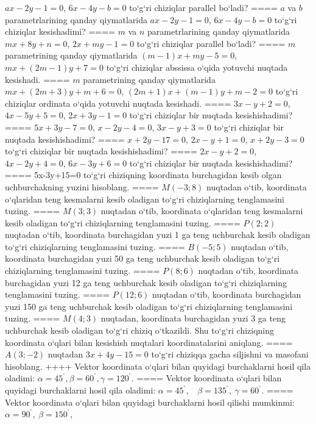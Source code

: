 $ax-2y-1=0$, $6x-4y-b=0$ to‘g‘ri chiziqlar parallel bo‘ladi?
====
$a$ va $b$ parametrlarining qanday qiymatlarida
$ax-2y-1=0$, $6x-4y-b=0$ to‘g‘ri chiziqlar kesishadimi?
====
$m$ va $n$ parametrlarining qanday qiymatlarida
$mx+8y+n=0$, $2x+my-1=0$ to‘g‘ri chiziqlar parallel bo‘ladi?
====
$m$ parametrining qanday qiymatlarida
$ (m-1) x+my-5=0$, $mx+ (2m-1) y+7=0$ to‘g‘ri chiziqlar abssissa
o‘qida yotuvchi nuqtada kesishadi.
====
$m$ parametrining qanday qiymatlarida
$mx+ (2m+3) y+m+6=0$, $ (2m+1) x+ (m-1) y+m-2=0$ to‘g‘ri chiziqlar ordinata
o‘qida yotuvchi nuqtada kesishadi.
====
$3x-y+2=0$, $4x-5y+5=0$, $2x+3y-1=0$
to‘g‘ri chiziqlar bir nuqtada kesishishadimi?
====
$5x+3y-7=0$, $x-2y-4=0$, $3x-y+3=0$
to‘g‘ri chiziqlar bir nuqtada kesishishadimi?
====
$x+2y-17=0$, $2x-y+1=0$, $x+2y-3=0$
to‘g‘ri chiziqlar bir nuqtada kesishishadimi?
====
$2x-y+2=0$, $4x-2y+4=0$, $6x-3y+6=0$
to‘g‘ri chiziqlar bir nuqtada kesishishadimi?
====
5x-3y+15=0 to‘g‘ri chiziqning koordinata burchagidan
kesib olgan uchburchakning yuzini hisoblang.
====
$M (-3;8) $ nuqtadan o‘tib, koordinata o‘qlaridan
teng kesmalarni kesib oladigan to‘g‘ri chiziqlarning tenglamasini tuzing.
====
$M (3;3)$ nuqtadan o‘tib, koordinata o‘qlaridan teng
kesmalarni kesib oladigan to‘g‘ri chiziqlarning tenglamasini tuzing.
====
$P (2;2)$ nuqtadan o‘tib, koordinata burchagidan
yuzi 1 ga teng uchburchak kesib oladigan to‘g‘ri chiziqlarning
tenglamasini tuzing.
====
$B (-5;5)$ nuqtadan o‘tib, koordinata burchagidan
yuzi 50 ga teng uchburchak kesib oladigan to‘g‘ri chiziqlarning tenglamasini
tuzing.
====
$P (8;6) $ nuqtadan o‘tib, koordinata burchagidan
yuzi 12 ga teng uchburchak kesib oladigan to‘g‘ri chiziqlarning tenglamasini
tuzing.
====
$P (12;6)$ nuqtadan o‘tib, koordinata burchagidan
yuzi 150 ga teng uchburchak kesib oladigan to‘g‘ri chiziqlarning
tenglamasini tuzing.
====
$M (4;3) $ nuqtadan, koordinata burchagidan
yuzi 3 ga teng uchburchak kesib oladigan to‘g‘ri chiziq o‘tkazildi.
Shu to‘g‘ri chiziqning koordinata o‘qlari bilan kesishish nuqtalari
koordinatalarini aniqlang.
====
$A (3;-2) $ nuqtadan $3x+4y-15=0$ to‘g‘ri chiziqqa
gacha siljishni va masofani hisoblang.
++++
Vektor koordinata o‘qlari bilan quyidagi burchaklarni hosil qila oladimi:
$\alpha = 45^{{^\circ}},\beta = 60^{{^\circ}},\gamma = 120^{{^\circ}}$.
====
Vektor koordinata o‘qlari bilan quyidagi burchaklarni hosil qila oladimi:
$\alpha = 45^{{^\circ}},\ \ \ \ \beta = 135^{{^\circ}},\ \gamma = 60^{{^\circ}}$.
====
Vektor koordinata o‘qlari bilan quyidagi burchaklarni hosil qilishi
mumkinmi: $\alpha = 90^{{^\circ}},\ \beta = 150^{{^\circ}}$,
